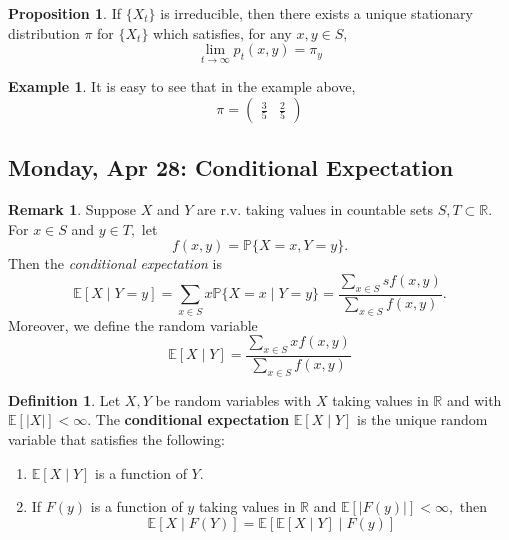 \documentclass[10pt, oneside]{article}
\newcommand{\bbR}{\mathbb{R}}
\newcommand{\bbP}{\mathbb{P}}
\newcommand{\bbE}{\mathbb{E}}
\theoremstyle{definition}
\newtheorem{exmp}{Example}[section]
\newtheorem{defn}{Definition}
\newtheorem{prop}{Proposition}
\newtheorem{rem}{Remark}
\begin{document}
\begin{prop}
    If $\{X_t\}$ is irreducible, then there exists a unique stationary distribution $\pi$ for $\{X_t\}$ which satisfies, for any $x,y \in S,$
    \[\lim_{t\to \infty} p_t(x,y) = \pi_y\]
\end{prop}
\begin{exmp}
    It is easy to see that in the example above, 
    \[\pi = \begin{pmatrix}
        \frac{3}{5} & \frac{2}{5}
    \end{pmatrix}\]
\end{exmp}

\newpage
\subsection{Monday, Apr 28: Conditional Expectation}

\begin{rem}
    Suppose $X$ and $Y$ are r.v. taking values in countable sets $S,T \subset \bbR.$ For $x \in S$ and $y \in T,$ let 
    \[f(x,y) = \bbP\{X = x, Y = y\}.\] Then the \textit{conditional expectation} is 
    \[\bbE[X \mid Y = y] = \sum_{x \in S}x \bbP\{X = x \mid Y = y\} = \frac{\displaystyle\sum_{x\in S}s f(x,y)}{\displaystyle\sum_{x\in S}f(x,y)}.\] Moreover, we define the random variable
    \[\bbE[X \mid Y] = \frac{\displaystyle\sum_{x \in S} xf(x,y)}{\displaystyle\sum_{x\in S}f(x,y)}\]
\end{rem}

\begin{defn}
    Let $X,Y$ be random variables with $X$ taking values in $\bbR$ and with $\bbE[ | X|] < \infty.$ The \textbf{conditional expectation} $\bbE[X \mid Y]$ is the unique random variable  that satisfies the following:
    \begin{enumerate}
        \item $\bbE[X \mid Y]$ is a function of $Y.$
        \item If $F(y)$ is a function of $y$ taking values in $\bbR$ and $\bbE[ |F(y) | ] < \infty,$ then 
        \[\bbE[X \mid F(Y)] = \bbE[\bbE[X \mid Y] \mid F(y)]\]
    \end{enumerate}
\end{defn}
\end{document}
